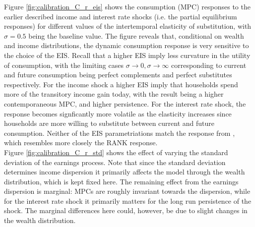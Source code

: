 Figure \ref{fig:calibration_C_r_eis} shows the consumption (MPC) responses to the earlier described income and interest rate shocks (i.e. the partial equilibrium responses) for different values of the intertemporal elasticity of substitution, with $\sigma=0.5$ being the baseline value. The figure reveals that, conditional on wealth and income distributions, the dynamic consumption response is very sensitive to the choice of the EIS. Recall that a higher EIS imply less curvature in the utility of consumption, with the limiting cases $\sigma\rightarrow0,\sigma\rightarrow\infty$ corresponding to current and future consumption being perfect complements and perfect substitutes respectively. 
For the income shock a higher EIS imply that households spend more of the transitory income gain today, with the result being a higher contemporaneous MPC, and higher persistence. For the interest rate shock, the response becomes signficantly more volatile as the elasticity increases since households are more willing to substitute between current and future consumption. Neither of the EIS parametriations match the response from \citet{kaplan2018monetary}, which resembles more closely the RANK response. \\

Figure \ref{fig:calibration_C_r_std} shows the effect of varying the standard deviation of the earnings process. Note that since the standard deviation determines income dispersion it primarily affects the model through the wealth distribution, which is kept fixed here. The remaining effect from the earnings dispersion is marginal: MPCs are roughly invariant towards the dispersion, while for the interest rate shock it primarily matters for the long run persistence of the shock. The marginal differences here could, however, be due to slight changes in the wealth distribution.  \\


